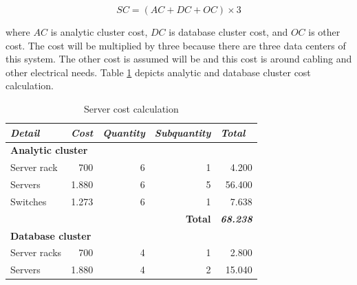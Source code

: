 \begin{equation*}
SC = (AC + DC + OC) \times 3
\end{equation*}

where $AC$ is analytic cluster cost, $DC$ is database cluster cost, and $OC$ is other cost. The cost will be multiplied by three because there are three data centers of this system. The other cost is assumed will be  and this cost is around cabling and other electrical needs. Table \ref{table:server-cost} depicts analytic and database cluster cost calculation.

\begin{table}[H]
\centering
\caption{Server cost calculation}
\label{table:server-cost}
\begin{tabular}{lrrrr}
\hline
\textit{Detail}  & \multicolumn{1}{l}{\textit{Cost}} & \multicolumn{1}{l}{\textit{Quantity}} & \multicolumn{1}{l}{\textit{Subquantity}} & \multicolumn{1}{l}{\textit{Total}} \\ \hline
\multicolumn{5}{l}{\textbf{Analytic cluster}}                                                                                                                                \\ \hline
Server rack      & 700                               & 6                                     & 1                                        & 4.200                              \\
Servers          & 1.880                             & 6                                     & 5                                        & 56.400                             \\
Switches         & 1.273                             & 6                                     & 1                                        & 7.638                              \\ \hline
\multicolumn{4}{r}{\textbf{Total}}                                                                                                      & \textit{\textbf{68.238}}           \\ \hline
\multicolumn{5}{l}{\textbf{Database cluster}}                                                                                                                                \\ \hline
Server racks     & 700                               & 4                                     & 1                                        & 2.800                              \\
Servers          & 1.880                             & 4                                     & 2                                        & 15.040                             \\

\end{tabular}
\end{table}
